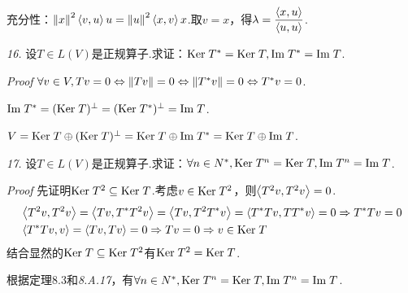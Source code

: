 充分性：\(\norm{x}^2\ip{v}{u}u=\norm{u}^2\ip{x}{v}x\).取\(v=x\)，得\(\lambda=\dfrac{\ip{x}{u}}{\ip{u}{u}}\).

\hspace*{\fill}

\textit{16.}
设\(T \in L(V)\)是正规算子.求证：\(\Ker T^*=\Ker T,\Img T^*=\Img T\).

\textit{Proof}
\(\forall v \in V,Tv=0 \Leftrightarrow \norm{Tv}=0 \Leftrightarrow \norm{T^*v}=0 \Leftrightarrow T^*v=0\).

\(\Img T^*=(\Ker T)^\bot=(\Ker T^*)^\bot=\Img T\).

\(V=\Ker T \oplus (\Ker T)^\bot=\Ker T \oplus \Img T^*=\Ker T \oplus \Img T\).

\hspace*{\fill}

\textit{17.}
设\(T \in L(V)\)是正规算子.求证：\(\forall n \in N^*,\Ker T^n=\Ker T,\Img T^n=\Img T\).

\textit{Proof}
先证明\(\Ker T^2 \subseteq \Ker T\).考虑\(v \in \Ker T^2\)，则\(\ip{T^2 v}{T^2 v}=0\).
    \begin{align*}
        &\ip{T^2 v}{T^2 v}=\ip{Tv}{T^*T^2v}=\ip{Tv}{T^2T^*v}=\ip{T^*Tv}{TT^*v}=0 \Rightarrow T^*Tv=0 \\
        &\ip{T^*Tv}{v}=\ip{Tv}{Tv}=0 \Rightarrow Tv=0 \Rightarrow v \in \Ker T
    \end{align*}
结合显然的\(\Ker T \subseteq \Ker T^2\)有\(\Ker T^2=\Ker T\).

根据定理8.3和\textit{8.A.17}，有\(\forall n \in N^*,\Ker T^n=\Ker T,\Img T^n=\Img T\).

